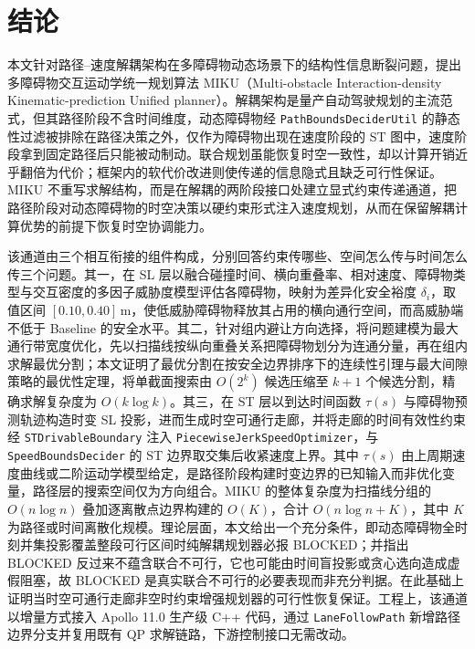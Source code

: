 \documentclass[a4paper,11pt]{ctexart}
\theoremstyle{definition}
\begin{document}
\section{结论}
\label{sec:conclusion}

本文针对路径--速度解耦架构在多障碍物动态场景下的结构性信息断裂问题，提出多障碍物交互运动学统一规划算法 MIKU（Multi-obstacle Interaction-density Kinematic-prediction Unified planner）。解耦架构是量产自动驾驶规划的主流范式，但其路径阶段不含时间维度，动态障碍物经 \texttt{PathBoundsDeciderUtil} 的静态性过滤被排除在路径决策之外，仅作为障碍物出现在速度阶段的 ST 图中，速度阶段拿到固定路径后只能被动制动。联合规划虽能恢复时空一致性，却以计算开销近乎翻倍为代价；框架内的软代价改进则使传递的信息隐式且缺乏可行性保证。MIKU 不重写求解结构，而是在解耦的两阶段接口处建立显式约束传递通道，把路径阶段对动态障碍物的时空决策以硬约束形式注入速度规划，从而在保留解耦计算优势的前提下恢复时空协调能力。

该通道由三个相互衔接的组件构成，分别回答约束传哪些、空间怎么传与时间怎么传三个问题。其一，在 SL 层以融合碰撞时间、横向重叠率、相对速度、障碍物类型与交互密度的多因子威胁度模型评估各障碍物，映射为差异化安全裕度 $\delta_i$，取值区间 $[0.10, 0.40]$\,m，使低威胁障碍物释放其占用的横向通行空间，而高威胁端不低于 Baseline 的安全水平。其二，针对组内避让方向选择，将问题建模为最大通行带宽度优化，先以扫描线按纵向重叠关系把障碍物划分为连通分量，再在组内求解最优分割；本文证明了最优分割在按安全边界排序下的连续性引理与最大间隙策略的最优性定理，将单截面搜索由 $O(2^k)$ 候选压缩至 $k+1$ 个候选分割，精确求解复杂度为 $O(k\log k)$。其三，在 ST 层以到达时间函数 $\tau(s)$ 与障碍物预测轨迹构造时变 SL 投影，进而生成时空可通行走廊，并将走廊的时间有效性约束经 \texttt{STDrivableBoundary} 注入 \texttt{PiecewiseJerkSpeedOptimizer}，与 \texttt{SpeedBoundsDecider} 的 ST 边界取交集后收紧速度上界。其中 $\tau(s)$ 由上周期速度曲线或二阶运动学模型给定，是路径阶段构建时变边界的已知输入而非优化变量，路径层的搜索空间仅为方向组合。MIKU 的整体复杂度为扫描线分组的 $O(n\log n)$ 叠加逐离散点边界构建的 $O(K)$，合计 $O(n\log n + K)$，其中 $K$ 为路径或时间离散化规模。理论层面，本文给出一个充分条件，即动态障碍物全时刻并集投影覆盖整段可行区间时纯解耦规划器必报 BLOCKED；并指出 BLOCKED 反过来不蕴含联合不可行，它也可能由时间盲投影或贪心选向造成虚假阻塞，故 BLOCKED 是真实联合不可行的必要表现而非充分判据。在此基础上证明当时空可通行走廊非空时约束增强规划器的可行性恢复保证。工程上，该通道以增量方式接入 Apollo 11.0 生产级 C++ 代码，通过 \texttt{LaneFollowPath} 新增路径边界分支并复用既有 QP 求解链路，下游控制接口无需改动。
\end{document}
